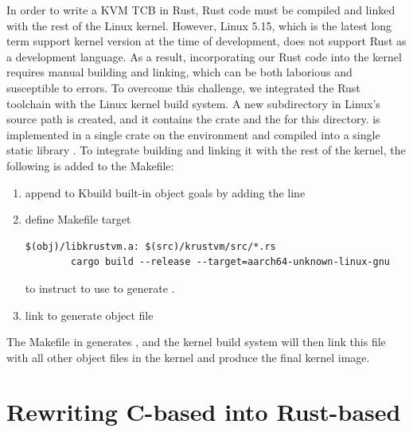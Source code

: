 In order to write a KVM TCB in Rust, Rust code must be compiled and linked with
the rest of the Linux kernel.
However, Linux 5.15, which is the latest long term support kernel version at
the time of \rustsec{} development, does not support Rust as a development
language. As a result, incorporating our Rust code into the kernel requires
manual building and linking, which can be both laborious and susceptible to
errors.
To overcome this challenge, we integrated the Rust toolchain with the Linux
kernel build system. A new subdirectory in Linux's source path
 is created, and it contains the \rustcore{} crate
and the  for this directory.
\rustcore{} is implemented in a single crate on the  environment
and compiled into a single static library .
To integrate building  and linking it with the
rest of the kernel, the following is added to the Makefile:
\begin{enumerate}
\item{append  to Kbuild built-in object goals  by adding the line }
\item{define Makefile target
\begin{listing}[hbtp]
    \begin{verbatim}
$(obj)/libkrustvm.a: $(src)/krustvm/src/*.rs
        cargo build --release --target=aarch64-unknown-linux-gnu
    \end{verbatim}
    \label{lst:Makefile}
    \vspace{-1.2cm}
\end{listing}
to instruct  to use  to generate .
}
\item{link  to generate object file }
\end{enumerate}
The Makefile in  generates ,
and the kernel build system will then link this file with all other object
files in the kernel and produce the final kernel image.

\section{Rewriting C-based \secore{} into Rust-based \rustcore{}}

%

